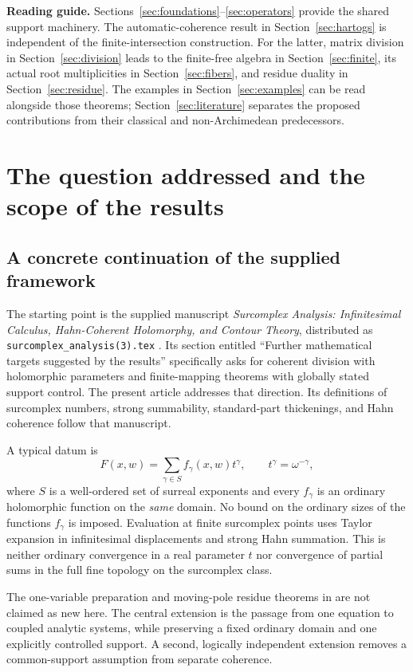 \documentclass[11pt,oneside]{article}
\numberwithin{equation}{section}
\theoremstyle{definition}
\theoremstyle{remark}\newtheorem{remark}[theorem]{Remark}
\begin{document}
\clearpage
\setcounter{tocdepth}{1}
\tableofcontents
\vspace{1em}
\noindent\textbf{Reading guide.}
Sections~\ref{sec:foundations}--\ref{sec:operators} provide the shared support machinery.
The automatic-coherence result in Section~\ref{sec:hartogs} is independent of the
finite-intersection construction. For the latter, matrix division in
Section~\ref{sec:division} leads to the finite-free algebra in
Section~\ref{sec:finite}, its actual root multiplicities in
Section~\ref{sec:fibers}, and residue duality in Section~\ref{sec:residue}.
The examples in Section~\ref{sec:examples} can be read alongside those theorems;
Section~\ref{sec:literature} separates the proposed contributions from their
classical and non-Archimedean predecessors.
\clearpage

\section{The question addressed and the scope of the results}\label{sec:scope}
\subsection{A concrete continuation of the supplied framework}
The starting point is the supplied manuscript \emph{Surcomplex Analysis: Infinitesimal Calculus, Hahn-Coherent Holomorphy, and Contour Theory}, distributed as \texttt{surcomplex\_analysis(3).tex} \cite{Source}. Its section entitled ``Further mathematical targets suggested by the results'' specifically asks for coherent division with holomorphic parameters and finite-mapping theorems with globally stated support control. The present article addresses that direction. Its definitions of surcomplex numbers, strong summability, standard-part thickenings, and Hahn coherence follow that manuscript.

A typical datum is
\[
 F(x,w)=\sum_{\gamma\in S}f_\gamma(x,w)t^\gamma,
 \qquad t^\gamma=\omega^{-\gamma},
\]
where \(S\) is a well-ordered set of surreal exponents and every \(f_\gamma\) is an ordinary holomorphic function on the \emph{same} domain. No bound on the ordinary sizes of the functions \(f_\gamma\) is imposed. Evaluation at finite surcomplex points uses Taylor expansion in infinitesimal displacements and strong Hahn summation. This is neither ordinary convergence in a real parameter \(t\) nor convergence of partial sums in the full fine topology on the surcomplex class.

The one-variable preparation and moving-pole residue theorems in \cite{Source} are not claimed as new here. The central extension is the passage from one equation to coupled analytic systems, while preserving a fixed ordinary domain and one explicitly controlled support. A second, logically independent extension removes a common-support assumption from separate coherence.
\end{document}
